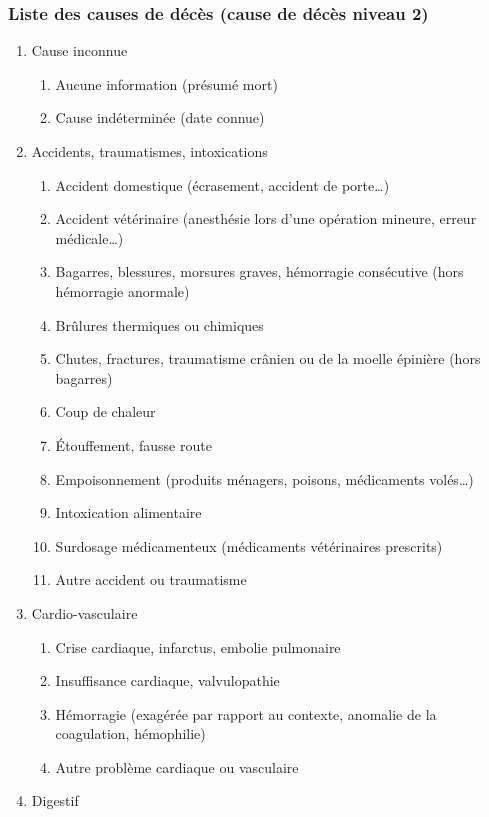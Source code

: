\documentclass[a4paper,10pt]{article}
\begin{document}
\subsubsection{Liste des causes de décès (cause de décès niveau 2)}

\begin{enumerate}
\item Cause inconnue
\begin{enumerate}
\item Aucune information (présumé mort)
\item Cause indéterminée (date connue)
\end{enumerate}
\item Accidents, traumatismes, intoxications
\begin{enumerate}
\item Accident domestique (écrasement, accident de porte…)
\item Accident vétérinaire (anesthésie lors d’une opération mineure, erreur médicale…)
\item Bagarres, blessures, morsures graves, hémorragie consécutive (hors hémorragie anormale)
\item Brûlures thermiques ou chimiques
\item Chutes, fractures, traumatisme crânien ou de la moelle épinière (hors bagarres)
\item Coup de chaleur
\item Étouffement, fausse route
\item Empoisonnement (produits ménagers, poisons, médicaments volés…)
\item Intoxication alimentaire
\item Surdosage médicamenteux (médicaments vétérinaires prescrits)
\item Autre accident ou traumatisme
\end{enumerate}
\item Cardio-vasculaire
\begin{enumerate}
\item Crise cardiaque, infarctus, embolie pulmonaire
\item Insuffisance cardiaque, valvulopathie
\item Hémorragie (exagérée par rapport au contexte, anomalie de la coagulation, hémophilie)
\item Autre problème cardiaque ou vasculaire
\end{enumerate}
\item Digestif
\begin{enumerate}

\end{enumerate}
\end{enumerate}
\end{document}
